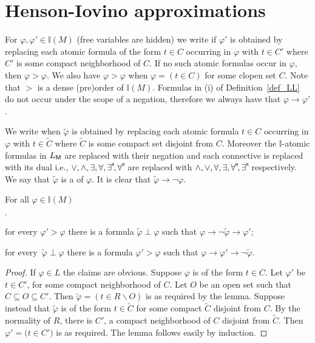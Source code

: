 \documentclass[10pt,oneside]{amsproc}
\newcommand{\mylabel}[1]{{#1}\hfill}
\renewenvironment{itemize}
  {\begin{list}{$\cdot$}{%
  \setlength{\parskip}{0mm}
  \setlength{\topsep}{.2\baselineskip}
  \setlength{\rightmargin}{0mm}
  \setlength{\listparindent}{0mm}
  \setlength{\itemindent}{0mm}
  \setlength{\labelwidth}{3ex}
  \setlength{\itemsep}{.2\baselineskip}
  \setlength{\parsep}{.2\baselineskip}
  \setlength{\partopsep}{0mm}
  \setlength{\labelsep}{1ex}
  \setlength{\leftmargin}{\labelwidth+\labelsep}
  \let\makelabel\mylabel}}{%
\end{list}}
\renewcommand*{\emph}[1]{%
   \smash{\tikz[baseline]\node[rectangle, fill=teal!25, rounded corners, inner xsep=0.5ex, inner ysep=0.2ex, anchor=base, minimum height = 2.7ex]{#1};}}
\begin{document}
\section{Henson-Iovino approximations}\label{ultrapws}


For $\varphi,\varphi'\in\mathds{I}(M)$ (free variables are hidden) we write \emph{$\varphi'>\varphi$\/} if $\varphi'$ is obtained by replacing each atomic formula of the form $t\in C$ occurring in $\varphi$ with $t\in C'$ where $C'$ is some compact neighborhood of $C$.
If no such atomic formulas occur in $\varphi$, then $\varphi>\varphi$.
We also have $\varphi>\varphi$ when $\varphi=(t\in C)$ for some clopen set $C$.
Note that $>$ is a dense (pre)order of $\mathds{I}(M)$.
Formulas in (i) of Definition~\ref{def_LL} do not occur under the scope of a negation, therefore we always have that $\varphi\to\varphi'$.

We write \emph{$\tilde{\varphi}\perp\varphi$\/} when $\tilde{\varphi}$ is obtained by replacing each atomic formula $t\in C$ occurring in $\varphi$ with $t\in\tilde{C}$ where $\tilde{C}$ is some compact set disjoint from $C$.
Moreover the $\mathds{I}$-atomic formulas in $L_{\sf M}$ are replaced with their negation and each connective is replaced with its dual i.e., $\vee, \wedge, \exists, \forall, \existsR , \forallR $ are replaced with $\wedge,\vee,\forall,\exists,\forallR ,\existsR $ respectively.
We say that  $\tilde{\varphi}$ is a \emph{strong negation} of $\varphi$.
It is clear that $\tilde{\varphi}\rightarrow\neg\varphi$.

\begin{lemma}\label{lem_interpolation}
  For all  $\varphi\in\mathds{I}(M)$
  \begin{itemize}
    \item[1.]for every $\varphi'>\varphi$ there is a formula $\tilde{\varphi}\perp\varphi$ such that $\varphi\rightarrow\neg \tilde{\varphi}\rightarrow\varphi'$;
    \item[2.] for every\, $\tilde{\varphi}\perp\varphi$ there is a formula $\varphi'>\varphi$ such that  $\varphi\rightarrow\varphi'\rightarrow\neg \tilde{\varphi}$.
  \end{itemize}
\end{lemma}

\begin{proof}
  If $\varphi\in L$ the claims are obvious.
  Suppose $\varphi$ is of the form $t\in C$.
  Let $\varphi'$ be $t\in C'$, for some compact neighborhood of $C$.
  Let $O$ be an open set such that $C\subseteq O\subseteq C'$.
  Then $\tilde{\varphi}=(t\in R\smallsetminus O)$ is as required by the lemma.
  Suppose instead that $\tilde{\varphi}$ is of the form $t\in\tilde{C}$ for some compact $\tilde{C}$ disjoint from $C$.
  By the normality of $R$, there is  $C'$, a compact neighborhood of $C$ disjoint from $\tilde{C}$.
  Then  $\varphi'=\big(t\in C'\big)$ is as required.
  The lemma follows easily by induction.
\end{proof}
\end{document}
